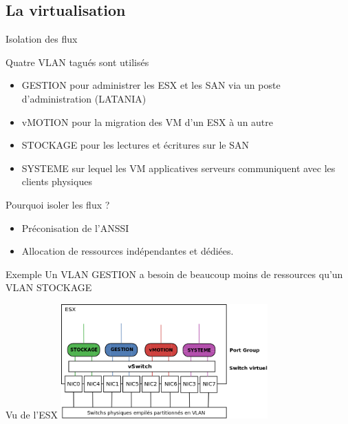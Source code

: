\documentclass[10pt]{beamer}
\begin{document}
\subsection{La virtualisation}





\begin{frame}{Isolation des flux}
\begin{block}{Quatre VLAN tagués sont utilisés}
\begin{itemize}
\item GESTION pour administrer les ESX et les SAN via un poste d'administration (LATANIA)
\item vMOTION pour la migration des VM d'un ESX à un autre
\item STOCKAGE pour les lectures et écritures sur le SAN
\item SYSTEME sur lequel les VM applicatives serveurs communiquent avec les clients physiques
\end{itemize}
\end{block}
\begin{block}{Pourquoi isoler les flux ?}
\begin{itemize}
    \item Préconisation de l'ANSSI
    \item Allocation de ressources indépendantes et dédiées.
\end{itemize}
\end{block}
\begin{exampleblock}{Exemple}
Un VLAN GESTION a besoin de beaucoup moins de ressources qu'un VLAN STOCKAGE
\end{exampleblock}
\end{frame}

\begin{frame}{Vu de l'ESX}
\includegraphics[width=300px]{Schemas/VLAN.png}
\end{frame}

\end{document}
